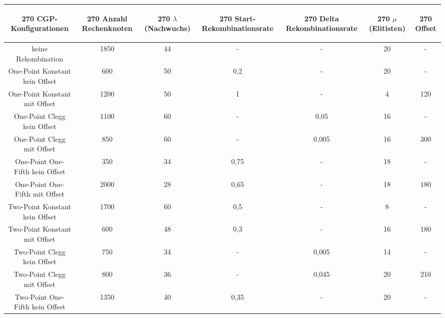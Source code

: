 \begin{table}[H]
	\centering
	\begin{tabular}{c | c | c | c | c | c | c}
		\begin{turn}{270} \textbf{CGP-Konfigurationen} \end{turn} & \begin{turn}{270} \textbf{Anzahl Rechenknoten} \end{turn} & \begin{turn}{270} \textbf{$\lambda$ (Nachwuchs)} \end{turn} & \begin{turn}{270} \textbf{Start-Rekombinationsrate} \end{turn} & \begin{turn}{270} \textbf{Delta Rekombinationsrate} \end{turn} & \begin{turn}{270} \textbf{$\mu$ (Elitisten)} \end{turn} & \begin{turn}{270} \textbf{Offset} \end{turn}\\
		\hline
		keine Rekombination & 1850 & 44 & - & - & 20 & -\\
		\hline
		One-Point Konstant kein Offset & 600 & 50 & 0,2 & - & 20 & - \\
		\hline
		One-Point Konstant mit Offset & 1200 & 50 & 1 & - & 4 & 120\\
		\hline
		One-Point Clegg kein Offset & 1100 & 60 & - & 0,05 & 16 & - \\
		\hline
		One-Point Clegg mit Offset & 850 & 60 & - & 0,005 & 16 & \color{red}300\color{black} \\
		\hline
		One-Point One-Fifth kein Offset & 350 & 34 & 0,75 & - & 18 & - \\
		\hline
		One-Point One-Fifth mit Offset & 2000 & 28 & 0,65 & - & 18 & 180 \\
		\hline
		Two-Point Konstant kein Offset & 1700 & 60 & 0,5 & - & 8 & - \\
		\hline
		Two-Point Konstant mit Offset & 600 & 48 & 0,3 & - & 16 & \color{red}180\color{black} \\
		\hline
		Two-Point Clegg kein Offset & 750 & 34 & - & 0,005 & 14 & - \\
		\hline
		Two-Point Clegg mit Offset & 800 & 36 & - & 0,045 & 20 & 210 \\
		\hline
		Two-Point One-Fifth kein Offset & 1350 & 40 & 0,35 & - & 20 & - \\
		\hline

\end{tabular}
\end{table}

